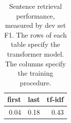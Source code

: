 \begin{table}[t]
  \setlength{\tabcolsep}{.25em}
  \footnotesize
  \centering

  \begin{tabular}{ r r r  }
    \toprule
                  first & last & tf-idf \\
    \midrule
    0.04 & 0.18 & 0.43 \\
  \end{tabular}

  \caption{Sentence retrieval performance, measured by dev set F1. The rows of each table specify the transformer model. The columns specify the training procedure.}
  \label{tbl:rationale_baseline}

\end{table}